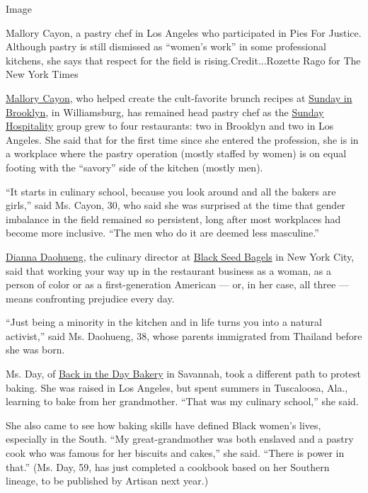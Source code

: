 Image

Mallory Cayon, a pastry chef in Los Angeles who participated in Pies For
Justice. Although pastry is still dismissed as ``women's work'' in some
professional kitchens, she says that respect for the field is
rising.Credit...Rozette Rago for The New York Times

\href{https://www.instagram.com/malkc/?hl=en}{Mallory Cayon}, who helped
create the cult-favorite brunch recipes at
\href{https://www.sundayinbrooklyn.com/}{Sunday in Brooklyn}, in
Williamsburg, has remained head pastry chef as the
\href{https://www.sundayhg.com/}{Sunday Hospitality} group grew to four
restaurants: two in Brooklyn and two in Los Angeles. She said that for
the first time since she entered the profession, she is in a workplace
where the pastry operation (mostly staffed by women) is on equal footing
with the ``savory'' side of the kitchen (mostly men).

``It starts in culinary school, because you look around and all the
bakers are girls,'' said Ms. Cayon, 30, who said she was surprised at
the time that gender imbalance in the field remained so persistent, long
after most workplaces had become more inclusive. ``The men who do it are
deemed less masculine.''

\href{https://www.instagram.com/dough_eung/?hl=en}{Dianna Daohueng}, the
culinary director at \href{https://www.blackseedbagels.com/}{Black Seed
Bagels} in New York City, said that working your way up in the
restaurant business as a woman, as a person of color or as a
first-generation American --- or, in her case, all three --- means
confronting prejudice every day.

``Just being a minority in the kitchen and in life turns you into a
natural activist,'' said Ms. Daohueng, 38, whose parents immigrated from
Thailand before she was born.

Ms. Day, of \href{https://backinthedaybakery.com/index.html\#/}{Back in
the Day Bakery} in Savannah, took a different path to protest baking.
She was raised in Los Angeles, but spent summers in Tuscaloosa, Ala.,
learning to bake from her grandmother. ``That was my culinary school,''
she said.

She also came to see how baking skills have defined Black women's lives,
especially in the South. ``My great-grandmother was both enslaved and a
pastry cook who was famous for her biscuits and cakes,'' she said.
``There is power in that.'' (Ms. Day, 59, has just completed a cookbook
based on her Southern lineage, to be published by Artisan next year.)

